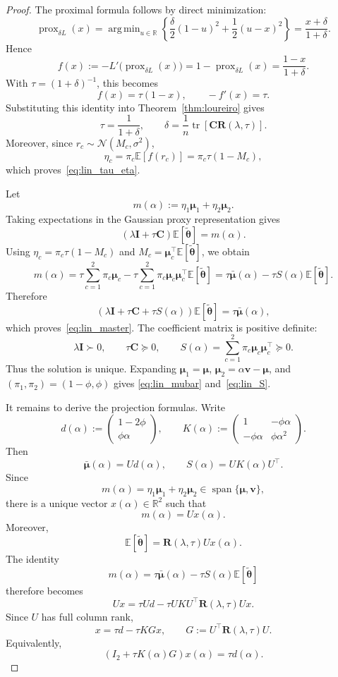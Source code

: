 \documentclass[11pt]{article}
\DeclareMathOperator{\tr}{tr}
\DeclareMathOperator*{\argmin}{arg\,min}
\DeclareMathOperator{\prox}{prox}
\newcommand{\RR}{\mathbb{R}}
\newcommand{\EE}{\mathbb{E}}
\newcommand{\NN}{\mathcal{N}}
\newcommand{\I}{\mathbf{I}}
\newcommand{\C}{\mathbf{C}}
\newcommand{\bv}{\mathbf{v}}
\newcommand{\bmu}{\boldsymbol{\mu}}
\newcommand{\btheta}{\boldsymbol{\theta}}
\begin{document}
\begin{proof}
The proximal formula follows by direct minimization:
\[
\prox_{\delta L}(x)
=
\argmin_{u\in\RR}
\left\{
\frac{\delta}{2}(1-u)^2+\frac12(u-x)^2
\right\}
=
\frac{x+\delta}{1+\delta}.
\]
Hence
\[
f(x):=-L'\!\bigl(\prox_{\delta L}(x)\bigr)
=
1-\prox_{\delta L}(x)
=
\frac{1-x}{1+\delta}.
\]
With \(\tau=(1+\delta)^{-1}\), this becomes
\[
f(x)=\tau(1-x),
\qquad
-f'(x)=\tau.
\]
Substituting this identity into Theorem~\ref{thm:loureiro} gives
\[
\tau=\frac{1}{1+\delta},
\qquad
\delta=\frac1n\tr\!\left[\C \mathbf{R}(\lambda,\tau)\right].
\]
Moreover, since \(r_c\sim\NN(M_c,\sigma^2)\),
\[
\eta_c
=
\pi_c\EE[f(r_c)]
=
\pi_c\tau(1-M_c),
\]
which proves~\eqref{eq:lin_tau_eta}.

Let
\[
m(\alpha):=\eta_1\bmu_1+\eta_2\bmu_2 .
\]
Taking expectations in the Gaussian proxy representation gives
\[
(\lambda\I+\tau\C)\EE[\tilde{\btheta}]=m(\alpha).
\]
Using \(\eta_c=\pi_c\tau(1-M_c)\) and
\(M_c=\bmu_c^\top\EE[\tilde{\btheta}]\), we obtain
\[
m(\alpha)
=
\tau\sum_{c=1}^2\pi_c\bmu_c
-
\tau\sum_{c=1}^2\pi_c\bmu_c\bmu_c^\top\EE[\tilde{\btheta}]
=
\tau\bar{\bmu}(\alpha)-\tau S(\alpha)\EE[\tilde{\btheta}].
\]
Therefore
\[
(\lambda\I+\tau\C+\tau S(\alpha))\EE[\tilde{\btheta}]
=
\tau\bar{\bmu}(\alpha),
\]
which proves~\eqref{eq:lin_master}. The coefficient matrix is positive
definite:
\[
\lambda\I\succ0,
\qquad
\tau\C\succeq0,
\qquad
S(\alpha)=\sum_{c=1}^2\pi_c\bmu_c\bmu_c^\top\succeq0.
\]
Thus the solution is unique. Expanding
\(\bmu_1=\bmu\), \(\bmu_2=\alpha\bv-\bmu\), and
\((\pi_1,\pi_2)=(1-\phi,\phi)\) gives
\eqref{eq:lin_mubar} and~\eqref{eq:lin_S}.

It remains to derive the projection formulas. Write
\[
d(\alpha):=
\begin{pmatrix}
1-2\phi\\
\phi\alpha
\end{pmatrix},
\qquad
K(\alpha):=
\begin{pmatrix}
1 & -\phi\alpha\\
-\phi\alpha & \phi\alpha^2
\end{pmatrix}.
\]
Then
\[
\bar{\bmu}(\alpha)=Ud(\alpha),
\qquad
S(\alpha)=UK(\alpha)U^\top .
\]
Since
\[
m(\alpha)=\eta_1\bmu_1+\eta_2\bmu_2\in\operatorname{span}\{\bmu,\bv\},
\]
there is a unique vector \(x(\alpha)\in\RR^2\) such that
\[
m(\alpha)=Ux(\alpha).
\]
Moreover,
\[
\EE[\tilde{\btheta}]=\mathbf{R}(\lambda,\tau)Ux(\alpha).
\]
The identity
\[
m(\alpha)=\tau\bar{\bmu}(\alpha)-\tau S(\alpha)\EE[\tilde{\btheta}]
\]
therefore becomes
\[
Ux
=
\tau Ud-\tau UKU^\top \mathbf{R}(\lambda,\tau)Ux.
\]
Since \(U\) has full column rank,
\[
x=\tau d-\tau K Gx,
\qquad
G:=U^\top \mathbf{R}(\lambda,\tau)U.
\]
Equivalently,
\[
(I_2+\tau K(\alpha)G)x(\alpha)=\tau d(\alpha).
\]


\end{proof}
\end{document}
